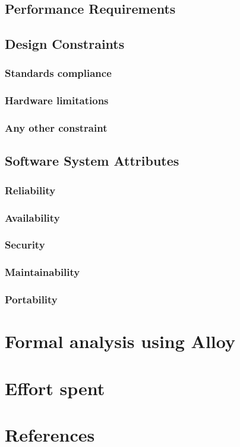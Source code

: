 \documentclass{article}
\begin{document}
        \subsection{Performance Requirements}
        \subsection{Design Constraints}
            \subsubsection{Standards compliance}
            \subsubsection{Hardware limitations}
            \subsubsection{Any other constraint}
        \subsection{Software System Attributes}
                \subsubsection{Reliability}
                \subsubsection{Availability}
                \subsubsection{Security}
                \subsubsection{Maintainability}
                \subsubsection{Portability}
                
    \section{Formal analysis using Alloy}
    
    \section{Effort spent}
    
    \section{References}
\end{document}

